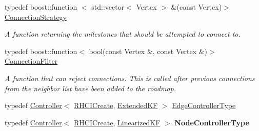 \begin{DoxyCompactItemize}
\item 
\hypertarget{class_f_i_r_m_a15cfbcaf52c0bdd5e6c1a969bbf7ea1e}{typedef boost\-::function\*
$<$ std\-::vector$<$ \-Vertex $>$\*
 \&(const \-Vertex)$>$ \hyperlink{class_f_i_r_m_a15cfbcaf52c0bdd5e6c1a969bbf7ea1e}{\-Connection\-Strategy}}\label{class_f_i_r_m_a15cfbcaf52c0bdd5e6c1a969bbf7ea1e}

\begin{DoxyCompactList}\small\item\em \-A function returning the milestones that should be attempted to connect to. \end{DoxyCompactList}\item 
\hypertarget{class_f_i_r_m_a2482eee2e5248d5bff3b3b56e5a593b3}{typedef boost\-::function$<$ bool(const \*
\-Vertex \&, const \-Vertex \&)$>$ \hyperlink{class_f_i_r_m_a2482eee2e5248d5bff3b3b56e5a593b3}{\-Connection\-Filter}}\label{class_f_i_r_m_a2482eee2e5248d5bff3b3b56e5a593b3}

\begin{DoxyCompactList}\small\item\em \-A function that can reject connections. \-This is called after previous connections from the neighbor list have been added to the roadmap. \end{DoxyCompactList}\item 
typedef \hyperlink{class_controller}{\-Controller}$<$ \hyperlink{class_r_h_c_i_create}{\-R\-H\-C\-I\-Create}, \*
\hyperlink{class_extended_k_f}{\-Extended\-K\-F} $>$ \hyperlink{class_f_i_r_m_a70abcb24fbc9f836b94119f65c8f8a37}{\-Edge\-Controller\-Type}
\item 
\hypertarget{class_f_i_r_m_adf37596ffd4dbf633d7cd0f27347d15c}{typedef \hyperlink{class_controller}{\-Controller}$<$ \hyperlink{class_r_h_c_i_create}{\-R\-H\-C\-I\-Create}, \*
\hyperlink{class_linearized_k_f}{\-Linearized\-K\-F} $>$ {\bfseries \-Node\-Controller\-Type}}\label{class_f_i_r_m_adf37596ffd4dbf633d7cd0f27347d15c}

\end{DoxyCompactItemize}

